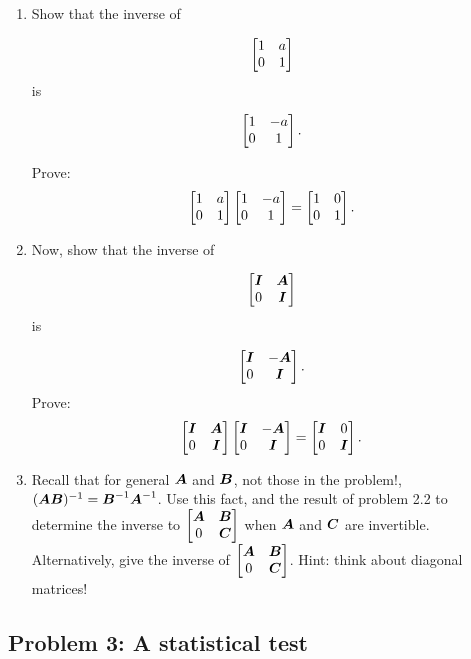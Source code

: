 \documentclass{article}
\begin{document}
\begin{enumerate}%
\item Show that the inverse of

\begin{displaymath}
\begin{bmatrix}  1 & a \\ 0 & 1  \end{bmatrix}
\end{displaymath}
is

\begin{displaymath}
\begin{bmatrix}  1 & -a \\ 0 & 1  \end{bmatrix}.
\end{displaymath}

Prove: \newline
\begin{displaymath}
\begin{bmatrix}  1 & a \\ 0 & 1  \end{bmatrix}
\begin{bmatrix}  1 & -a \\ 0 & 1  \end{bmatrix} =\begin{bmatrix}  1 & 0 \\ 0 & 1  \end{bmatrix} .
\end{displaymath}



\item Now, show that the inverse of

\begin{displaymath}
\begin{bmatrix}  \boldsymbol{I} & \boldsymbol{A} \\ 0 & \boldsymbol{I}  \end{bmatrix}
\end{displaymath}
is

\begin{displaymath}
\begin{bmatrix}  \boldsymbol{I}  & -\boldsymbol{A}  \\ 0 & \boldsymbol{I}   \end{bmatrix}.
\end{displaymath}
Prove: \newline
\begin{displaymath}
\begin{bmatrix}  \boldsymbol{I} & \boldsymbol{A} \\ 0 & \boldsymbol{I}  \end{bmatrix}
\begin{bmatrix}  \boldsymbol{I}  & -\boldsymbol{A}  \\ 0 & \boldsymbol{I}   \end{bmatrix} = \begin{bmatrix}  \boldsymbol{I}  & 0  \\ 0 & \boldsymbol{I}   \end{bmatrix}.
\end{displaymath}


\item Recall that for general $\boldsymbol{A}$ and $\boldsymbol{B}$, not those in the problem!, $(\boldsymbol{A} \boldsymbol{B})^{-1} = \boldsymbol{B}^{-1} \boldsymbol{A}^{-1}$. Use this fact, and the result of problem 2.2 to determine the inverse to $\begin{bmatrix}  \boldsymbol{A} & \boldsymbol{B} \\ 0 & \boldsymbol{C}  \end{bmatrix}$ when $\boldsymbol{A}$ and $\boldsymbol{C}$ are invertible. Alternatively, give the inverse of $\begin{bmatrix}  \boldsymbol{A} & \boldsymbol{B} \\ 0 & \boldsymbol{C}  \end{bmatrix}$. Hint: think about diagonal matrices!



\end{enumerate}
\hypertarget{problem_3_a_statistical_test_5}{}\subsection*{{Problem 3: A statistical test}}\label{problem_3_a_statistical_test_5}
\end{document}
